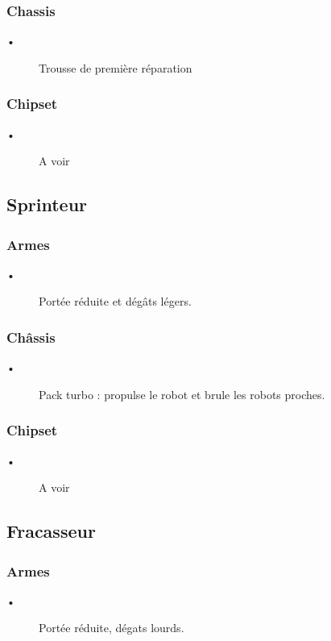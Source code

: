 \documentclass[10pt]{article}
\begin{document}
\subsubsection*{Chassis}
\begin{description}
\item [•] Trousse de première réparation
\end{description}

\subsubsection*{Chipset}
\begin{description}
\item [•]A voir
\end{description}

\subsection{Sprinteur}
\subsubsection*{Armes}
\begin{description}
\item [•] Portée réduite et dégâts légers.
\end{description}

\subsubsection*{Châssis}
\begin{description}
\item [•] Pack turbo : propulse le robot et brule les robots proches.
\end{description}

\subsubsection*{Chipset}
\begin{description}
\item [•]A voir
\end{description}

\subsection{Fracasseur}
\subsubsection*{Armes}
\begin{description}
\item [•] Portée réduite, dégats lourds.
\end{description}
\end{document}
